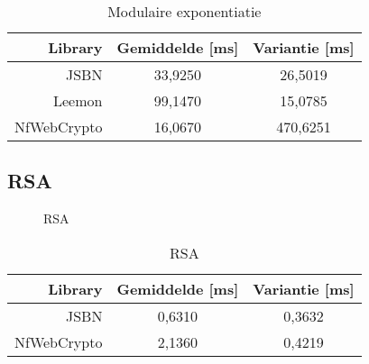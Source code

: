 \begin{table}
  \begin{center}
    \begin{tabular}{r | c c}
      Library & Gemiddelde [ms] & Variantie [ms] \\ \hline
      JSBN & 33,9250 & 26,5019  \\
      Leemon & 99,1470 & 15,0785 \\
      NfWebCrypto & 16,0670 & 470,6251
    \end{tabular}
    \caption{Modulaire exponentiatie}
    \label{tab:wc:modular_exponentiation}
  \end{center}
\end{table}

\subsection{RSA}

\begin{figure}
  \caption{RSA}
  \label{fig:wc:rsa}
\end{figure}

\begin{table}
  \begin{center}
    \begin{tabular}{r | c c}
      Library & Gemiddelde [ms] & Variantie [ms] \\ \hline
      JSBN & 0,6310 & 0,3632  \\
      NfWebCrypto & 2,1360 & 0,4219
    \end{tabular}
    \caption{RSA}
    \label{tab:wc:modular_exponentiation}
  \end{center}
\end{table}
